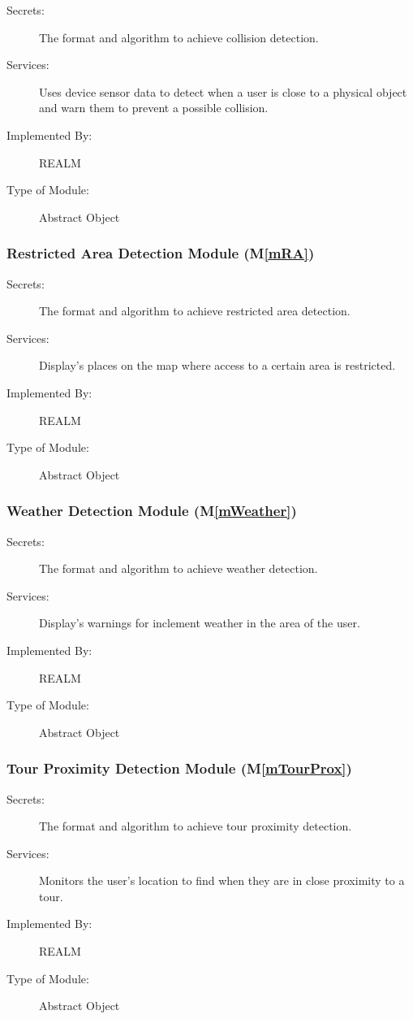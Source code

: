 \documentclass[12pt, titlepage]{article}
\newcommand{\mref}[1]{M\ref{#1}}
\begin{document}
\begin{description}
\item[Secrets:]The format and algorithm to achieve collision detection.
\item[Services:]Uses device sensor data to detect when a user is close to a physical object and warn them to prevent a possible collision.
\item[Implemented By:]REALM
\item[Type of Module:]Abstract Object
\end{description}

\subsubsection{Restricted Area Detection Module (\mref{mRA})}

\begin{description}
\item[Secrets:]The format and algorithm to achieve restricted area detection.
\item[Services:]Display's places on the map where access to a certain area is restricted.
\item[Implemented By:]REALM
\item[Type of Module:]Abstract Object
\end{description}

\subsubsection{Weather Detection Module (\mref{mWeather})}

\begin{description}
\item[Secrets:]The format and algorithm to achieve weather detection.
\item[Services:]Display's warnings for inclement weather in the area of the user.
\item[Implemented By:]REALM
\item[Type of Module:]Abstract Object
\end{description}

\subsubsection{Tour Proximity Detection Module (\mref{mTourProx})}

\begin{description}
\item[Secrets:]The format and algorithm to achieve tour proximity detection.
\item[Services:]Monitors the user's location to find when they are in close proximity to a tour.
\item[Implemented By:]REALM
\item[Type of Module:]Abstract Object
\end{description}
\end{document}
